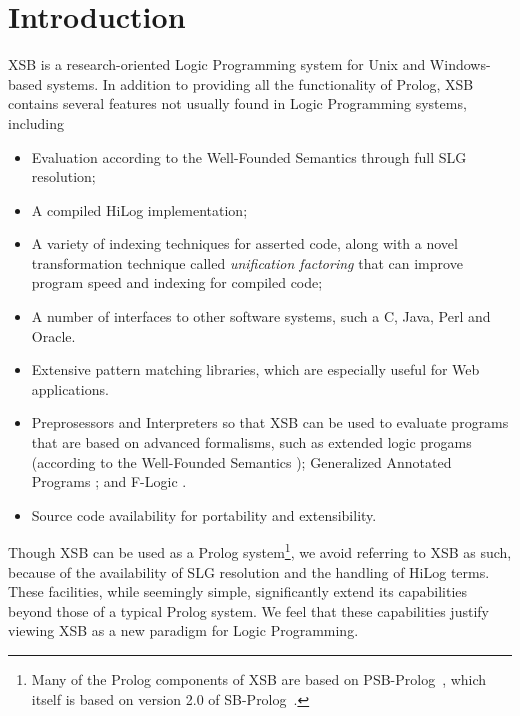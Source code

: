\chapter{Introduction} \label{introduction}

XSB is a research-oriented Logic Programming system for Unix and
Windows-based systems.  In addition to providing all the
functionality of Prolog, XSB contains several features not usually
found in Logic Programming systems, including
\begin{itemize}
\item Evaluation according to the Well-Founded Semantics \cite{VGRS91}
  through full SLG resolution;
\item A compiled HiLog implementation;
\item A variety of indexing techniques for asserted code, along with a
  novel transformation technique called {\em unification factoring} that
  can improve program speed and indexing for compiled code;
\item A number of interfaces to other software systems, such a C, Java,
  Perl and Oracle.
\item Extensive pattern matching libraries, which are especially useful for
  Web applications.
\item Preprosessors and Interpreters so that XSB can be used to evaluate
  programs that are based on advanced formalisms, such as extended logic
  progams (according to the Well-Founded Semantics \cite{ADP94});
Generalized Annotated Programs \cite{KiSu92}; and F-Logic \cite{KLW95}.
\item Source code availability for portability and extensibility.
\end{itemize}
 
Though XSB can be used as a Prolog system\footnote{Many of the Prolog
components of XSB are based on PSB-Prolog~\cite{Xu90}, which itself is
based on version 2.0 of SB-Prolog~\cite{Debr88}.}, we avoid referring
to XSB as such, because of the availability of SLG resolution and the
handling of HiLog terms.  These facilities, while seemingly simple,
significantly extend its capabilities beyond those of a typical Prolog
system. We feel that these capabilities justify viewing XSB as a new
paradigm for Logic Programming.

